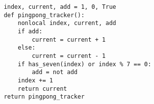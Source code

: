 \begin{blocksection}

\begin{solution}
\begin{lstlisting}
    index, current, add = 1, 0, True
    def pingpong_tracker():
        nonlocal index, current, add
        if add:
            current = current + 1
        else:
            current = current - 1
        if has_seven(index) or index % 7 == 0:
            add = not add
        index += 1
        return current
    return pingpong_tracker
\end{lstlisting}
\end{solution}
\end{blocksection}
